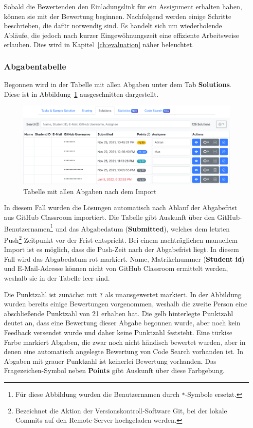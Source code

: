 Sobald die Bewertenden den Einladungslink für ein Assignment erhalten haben, können sie mit der Bewertung beginnen.
Nachfolgend werden einige Schritte beschrieben, die dafür notwendig sind.
Es handelt sich um wiederholende Abläufe, die jedoch nach kurzer Eingewöhnungszeit eine effiziente Arbeitsweise erlauben.
Dies wird in Kapitel~\ref{ch:evaluation} näher beleuchtet.

\subsubsection{Abgabentabelle}

Begonnen wird in der Tabelle mit allen Abgaben unter dem Tab \textbf{Solutions}.
Diese ist in Abbildung~\ref{fig:assignment-solutions-table} ausgeschnitten dargestellt.

\begin{figure}
    \centering
    \includegraphics[width=\textwidth]{images/assignment-solutions-table}
    \caption{Tabelle mit allen Abgaben nach dem Import}
    \label{fig:assignment-solutions-table}
\end{figure}

In diesem Fall wurden die Lösungen automatisch nach Ablauf der Abgabefrist aus GitHub Classroom importiert.
Die Tabelle gibt Auskunft über den GitHub-Benutzernamen\footnote{
    Für diese Abbildung wurden die Benutzernamen durch \texttt{*}-Symbole ersetzt.
} und das Abgabedatum (\textbf{Submitted}), welches dem letzten Push\footnote{
    Bezeichnet die Aktion der Versionskontroll-Software Git, bei der lokale Commits auf den Remote-Server hochgeladen werden.
}-Zeitpunkt vor der Frist entspricht.
Bei einem nachträglichen manuellem Import ist es möglich, dass die Push-Zeit nach der Abgabefrist liegt.
In diesem Fall wird das Abgabedatum rot markiert.
Name, Matrikelnummer (\textbf{Student \acs{id}}) und E-Mail-Adresse können nicht von GitHub Classroom ermittelt werden, weshalb sie in der Tabelle leer sind.

Die Punktzahl ist zunächst mit \texttt{?} als unausgewertet markiert.
In der Abbildung wurden bereits einige Bewertungen vorgenommen, weshalb die zweite Person eine abschließende Punktzahl von 21 erhalten hat.
Die gelb hinterlegte Punktzahl deutet an, dass eine Bewertung dieser Abgabe begonnen wurde, aber noch kein Feedback versendet wurde und daher keine Punktzahl feststeht.
Eine türkise Farbe markiert Abgaben, die zwar noch nicht händisch bewertet wurden, aber in denen eine automatisch angelegte Bewertung von Code Search vorhanden ist.
In Abgaben mit grauer Punktzahl ist keinerlei Bewertung vorhanden.
Das Fragezeichen-Symbol neben \textbf{Points} gibt Auskunft über diese Farbgebung.

